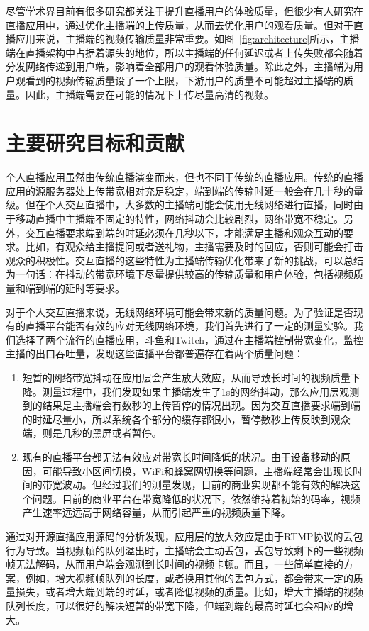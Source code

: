 尽管学术界目前有很多研究都关注于提升直播用户的体验质量，但很少有人研究在直播应用中，通过优化主播端的上传质量，从而去优化用户的观看质量。但对于直播应用来说，主播端的视频传输质量非常重要。如图~\ref{fig:architecture}所示，主播端在直播架构中占据着源头的地位，所以主播端的任何延迟或者上传失败都会随着分发网络传递到用户端，影响着全部用户的观看体验质量。除此之外，主播端为用户观看到的视频传输质量设了一个上限，下游用户的质量不可能超过主播端的质量。因此，主播端需要在可能的情况下上传尽量高清的视频。

\section{主要研究目标和贡献}
个人直播应用虽然由传统直播演变而来，但也不同于传统的直播应用。传统的直播应用的源服务器处上传带宽相对充足稳定，端到端的传输时延一般会在几十秒的量级。但在个人交互直播中，大多数的主播端可能会使用无线网络进行直播，同时由于移动直播中主播端不固定的特性，网络抖动会比较剧烈，网络带宽不稳定。另外，交互直播要求端到端的时延必须在几秒以下，才能满足主播和观众互动的要求。比如，有观众给主播提问或者送礼物，主播需要及时的回应，否则可能会打击观众的积极性。交互直播的这些特性为主播端传输优化带来了新的挑战，可以总结为一句话：在抖动的带宽环境下尽量提供较高的传输质量和用户体验，包括视频质量和端到端的延时等要求。

对于个人交互直播来说，无线网络环境可能会带来新的质量问题。为了验证是否现有的直播平台能否有效的应对无线网络环境，我们首先进行了一定的测量实验。我们选择了两个流行的直播应用，斗鱼和Twitch，通过在主播端控制带宽变化，监控主播的出口吞吐量，发现这些直播平台都普遍存在着两个质量问题：
\begin{enumerate}
  \item 短暂的网络带宽抖动在应用层会产生放大效应，从而导致长时间的视频质量下降。测量过程中，我们发现如果主播端发生了1s的网络抖动，那么应用层观测到的结果是主播端会有数秒的上传暂停的情况出现。因为交互直播要求端到端的时延尽量小，所以系统各个部分的缓存都很小，暂停数秒上传反映到观众端，则是几秒的黑屏或者暂停。
  \item 现有的直播平台都无法有效应对带宽长时间降低的状况。由于设备移动的原因，可能导致小区间切换，WiFi和蜂窝网切换等问题，主播端经常会出现长时间的带宽波动。但经过我们的测量发现，目前的商业实现都不能有效的解决这个问题。目前的商业平台在带宽降低的状况下，依然维持着初始的码率，视频产生速率远远高于网络容量，从而引起严重的视频质量下降。
\end{enumerate}

通过对开源直播应用源码的分析发现，应用层的放大效应是由于RTMP协议的丢包行为导致。当视频帧的队列溢出时，主播端会主动丢包，丢包导致剩下的一些视频帧无法解码，从而用户端会观测到长时间的视频卡顿。而且，一些简单直接的方案，例如，增大视频帧队列的长度，或者换用其他的丢包方式，都会带来一定的质量损失，或者增大端到端的时延，或者降低视频的质量。比如，增大主播端的视频队列长度，可以很好的解决短暂的带宽下降，但端到端的最高时延也会相应的增大。


